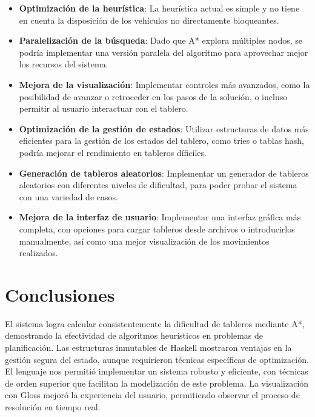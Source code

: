 \documentclass{article}
\begin{document}
\begin{itemize}
	\item \textbf{Optimización de la heurística}: La heurística actual es simple y no tiene en cuenta la disposición de los vehículos no directamente bloqueantes.
	\item \textbf{Paralelización de la búsqueda}: Dado que A* explora múltiples nodos, se podría implementar una versión paralela del algoritmo para aprovechar mejor los recursos del sistema.
	\item \textbf{Mejora de la visualización}: Implementar controles más avanzados, como la posibilidad de avanzar o retroceder en los pasos de la solución, o incluso permitir al usuario interactuar con el tablero.
	\item \textbf{Optimización de la gestión de estados}: Utilizar estructuras de datos más eficientes para la gestión de los estados del tablero, como tries o tablas hash, podría mejorar el rendimiento en tableros díficiles.
	\item \textbf{Generación de tableros aleatorios}: Implementar un generador de tableros aleatorios con diferentes niveles de dificultad, para poder probar el sistema con una variedad de casos.
	\item \textbf{Mejora de la interfaz de usuario}: Implementar una interfaz gráfica más completa, con opciones para cargar tableros desde archivos o introducirlos manualmente, así como una mejor visualización de los movimientos realizados.
\end{itemize}

\section*{Conclusiones}
El sistema logra calcular consistentemente la dificultad de tableros mediante A*, demostrando la efectividad de algoritmos heurísticos en problemas de planificación. Las estructuras inmutables de Haskell mostraron ventajas en la gestión segura del estado, aunque requirieron técnicas específicas de optimización. El lenguaje nos permitió implementar un sistema robusto y eficiente, con técnicas de orden superior que facilitan la modelización de este problema. La visualización con Gloss mejoró la experiencia del usuario, permitiendo observar el proceso de resolución en tiempo real.
\end{document}
